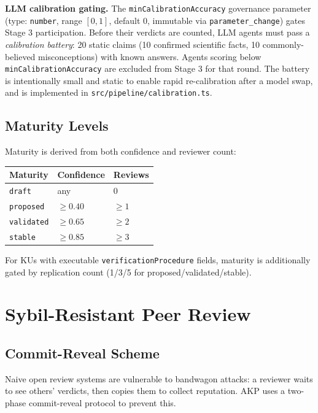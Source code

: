 \documentclass[10pt,twocolumn]{article}
\begin{document}
\textbf{LLM calibration gating.} The \texttt{minCalibrationAccuracy}
governance parameter (type: \texttt{number}, range $[0,1]$, default 0,
immutable via \texttt{parameter\_change}) gates Stage 3 participation.
Before their verdicts are counted, LLM agents must pass a
\emph{calibration battery}: 20 static claims (10 confirmed scientific
facts, 10 commonly-believed misconceptions) with known answers.
Agents scoring below \texttt{minCalibrationAccuracy} are excluded from
Stage 3 for that round. The battery is intentionally small and static
to enable rapid re-calibration after a model swap, and is implemented
in \texttt{src/pipeline/calibration.ts}.

\subsection{Maturity Levels}

Maturity is derived from both confidence and reviewer count:

\begin{center}
\small
\begin{tabular}{lll}
\toprule
\textbf{Maturity} & \textbf{Confidence} & \textbf{Reviews} \\
\midrule
\texttt{draft}     & any     & 0      \\
\texttt{proposed}  & $\geq 0.40$ & $\geq 1$ \\
\texttt{validated} & $\geq 0.65$ & $\geq 2$ \\
\texttt{stable}    & $\geq 0.85$ & $\geq 3$ \\
\bottomrule
\end{tabular}
\end{center}

For KUs with executable \texttt{verificationProcedure} fields, maturity is
additionally gated by replication count (1/3/5 for
proposed/validated/stable).

\section{Sybil-Resistant Peer Review}

\subsection{Commit-Reveal Scheme}

Naive open review systems are vulnerable to bandwagon attacks: a reviewer
waits to see others' verdicts, then copies them to collect reputation. AKP
uses a two-phase commit-reveal protocol to prevent this.
\end{document}
